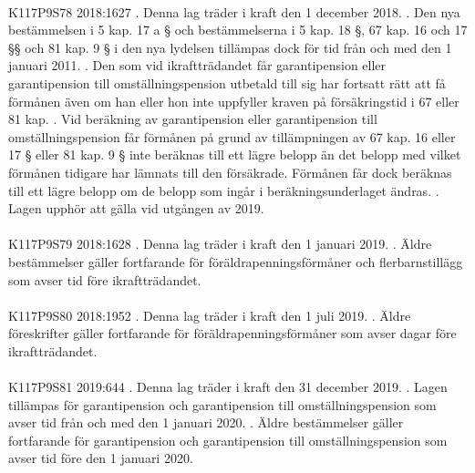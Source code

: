 \documentclass[a4paper,notitlepage,openany,10pt]{book}
\begin{document}
\paragraph*{}
{\tiny K117P9S78}
2018:1627
. Denna lag träder i kraft den 1 december 2018.
. Den nya bestämmelsen i 5 kap. 17 a § och bestämmelserna i 5 kap. 18 §, 67 kap. 16 och 17 §§ och 81 kap. 9 § i den nya lydelsen tillämpas dock för tid från och med den 1 januari 2011.
. Den som vid ikraftträdandet får garantipension eller garantipension till omställningspension utbetald till sig har fortsatt rätt att få förmånen även om han eller hon inte uppfyller kraven på försäkringstid i 67 eller 81 kap.
. Vid beräkning av garantipension eller garantipension till omställningspension får förmånen på grund av tillämpningen av 67 kap. 16 eller 17 § eller 81 kap. 9 § inte beräknas till ett lägre belopp än det belopp med vilket förmånen tidigare har lämnats till den försäkrade. Förmånen får dock beräknas till ett lägre belopp om de belopp som ingår i beräkningsunderlaget ändras.
. Lagen upphör att gälla vid utgången av 2019.
\paragraph*{}
{\tiny K117P9S79}
2018:1628
. Denna lag träder i kraft den 1 januari 2019.
. Äldre bestämmelser gäller fortfarande för föräldrapenningsförmåner och flerbarnstillägg som avser tid före ikraftträdandet.
\paragraph*{}
{\tiny K117P9S80}
2018:1952
. Denna lag träder i kraft den 1 juli 2019.
. Äldre föreskrifter gäller fortfarande för föräldrapenningsförmåner som avser dagar före ikraftträdandet.
\paragraph*{}
{\tiny K117P9S81}
2019:644
. Denna lag träder i kraft den 31 december 2019.
. Lagen tillämpas för garantipension och garantipension till omställningspension som avser tid från och med den 1 januari 2020.
. Äldre bestämmelser gäller fortfarande för garantipension och garantipension till omställningspension som avser tid före den 1 januari 2020.
\end{document}
